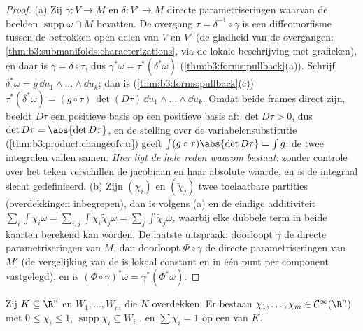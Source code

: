 \begin{proof}
(a) Zij $\gamma\colon V \to M$ en $\delta\colon V' \to M$ directe
parametriseringen waarvan de beelden $\operatorname{supp}\omega
\cap M$ bevatten. De overgang $\tau = \delta^{-1}\circ\gamma$ is
een diffeomorfisme tussen de betrokken open delen van $V$ en $V'$
(de gladheid van de overgangen:
\cref{thm:b3:submanifolds:characterizations}, via de lokale
beschrijving met grafieken), en daar is $\gamma =
\delta\circ\tau$, dus $\gamma^*\omega = \tau^*(\delta^*\omega)$
(\cref{thm:b3:forms:pullback}(a)). Schrijf $\delta^*\omega =
g\,\dd u_1\wedge\dots\wedge\dd u_k$; dan is
(\cref{thm:b3:forms:pullback}(c)) $\tau^*(\delta^*\omega) =
(g\circ\tau)\,\det(D\tau)\,\dd u_1\wedge\dots\wedge\dd u_k$.
Omdat beide frames direct zijn, beeldt $D\tau$ een positieve
basis op een positieve basis af: $\det D\tau > 0$, dus $\det
D\tau = \abs{\det D\tau}$, en de stelling over de
variabelensubstitutie (\cref{thm:b3:product:changeofvar}) geeft
$\int(g\circ\tau)\abs{\det D\tau} = \int g$: de twee integralen
vallen samen. \emph{Hier ligt de hele reden waarom 
bestaat}: zonder controle over het teken verschillen de jacobiaan
en haar absolute waarde, en is de integraal slecht gedefinieerd.
(b) Zijn $(\chi_i)$ en $(\tilde\chi_j)$ twee toelaatbare
partities (overdekkingen inbegrepen), dan is volgens (a) en de
eindige additiviteit $\sum_i\int\chi_i\omega =
\sum_{i,j}\int\chi_i\tilde\chi_j\omega =
\sum_j\int\tilde\chi_j\omega$, waarbij elke dubbele term in beide
kaarten berekend kan worden. De laatste uitspraak: doorloopt
$\gamma$ de directe parametriseringen van $M$, dan doorloopt
$\Phi\circ\gamma$ de directe parametriseringen van $M'$ (de
vergelijking van de  is lokaal constant en in één punt
per component vastgelegd), en is $(\Phi\circ\gamma)^*\omega =
\gamma^*(\Phi^*\omega)$.
\end{proof}

\begin{lemma}
\label{lem:b3:forms:partition}
Zij $K \subseteq \R^n$  en $W_1, \dots, W_m$  die $K$ overdekken. Er bestaan $\chi_1, \dots,
\chi_m \in \mathcal C^\infty(\R^n)$ met $0 \leq \chi_i \leq 1$,
$\operatorname{supp}\chi_i \subseteq W_i$ , en $\sum\chi_i
= 1$ op een  van $K$.
\end{lemma}

